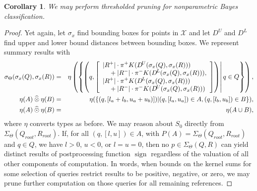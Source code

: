\documentclass{article}
\newtheorem{corollary} {Corollary}
\newcommand{\GNP}[1][\psi]{{#1}_{\Theta}}
\newcommand{\otimeshat}{\mathbin{\widehat{\otimes}}}
\newcommand{\odothat}{\mathbin{\widehat{\odot}}}
\DeclareMathOperator{\sign}{sign}
\begin{document}
\begin{corollary}
  We may perform thresholded pruning for nonparametric Bayes
  classification.
\end{corollary}
\begin{proof}
  Yet again, let $\sigma_x$ find bounding boxes for points in
  $\mathcal{X}$ and let $D^{\!U}$ and $D^{\!L}$ find upper and lower
  bound distances between bounding boxes.  We represent summary
  results with
  \begin{eqnarray*}
    \GNP[\sigma](\sigma_x(Q),\sigma_x(R)) & = & \eta \left( \left\{ \left.\! \left( q, \left[ \begin{array}{ll}
	\lefteqn{|R^+| \cdot \pi^+ K(D^{\!U}(\sigma_x(Q),\sigma_x(R)))} \\
	& \mbox{} + |R^-| \cdot \pi^- K(D^{\!L}(\sigma_x(Q),\sigma_x(R))), \\
	\lefteqn{|R^+| \cdot \pi^+ K(D^{\!L}(\sigma_x(Q),\sigma_x(R)))} \\
	& \mbox{} + |R^-| \cdot \pi^- K(D^{\!U}(\sigma_x(Q),\sigma_x(R)))
    \end{array} \right] \right) \right| q \in Q \right\} \right) , \\
    \eta(A) \otimeshat \eta(B) & = & \eta(\{(q,[l_a + l_b,u_a + u_b)]) | (q,[l_a,u_a]) \in A, (q,[l_b,u_b]) \in B\}), \\
    \eta(A) \odothat \eta(B) & = & \eta(A \cup B),
  \end{eqnarray*}
  where $\eta$ converts types as before.  We may reason about $S_0$
  directly from $\GNP[\Sigma](Q_{root},R_{root})$.  If, for all
  $(q,[l,u]) \in A$, with $P(A) = \GNP[\Sigma](Q_{root},R_{root})$ and
  $q \in Q$, we have $l > 0$, $u < 0$, or $l = u = 0$, then no $p \in
  \GNP[\Sigma](Q,R)$ can yield distinct results of postprocessing
  function $\sign$ regardless of the valuation of all other components
  of computation.  In words, when bounds on the kernel sums for some
  selection of queries restrict results to be positive, negative, or
  zero, we may prune further computation on those queries for all
  remaining references.
\end{proof}

\end{document}
